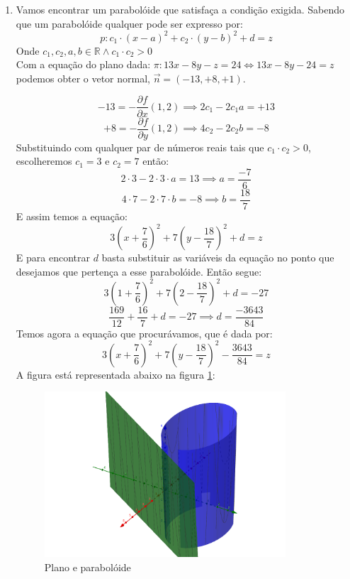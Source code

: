\documentclass[english,ngerman,parskip=half]{scrartcl}
\begin{document}
\begin{enumerate}
    \item
        Vamos encontrar um parabolóide que satisfaça a condição exigida.
        Sabendo que um parabolóide qualquer pode ser expresso por:
        $$ p: c_1 \cdot \left( x - a \right)^2 + c_2 \cdot \left( y - b\right)^2 + d = z$$
        Onde $c_1, c_2, a, b \in \mathbb{R} \land c_1 \cdot c_2 > 0$ \\
        Com a equação do plano dada: $ \pi: 13x - 8y - z = 24 \iff 13x -8y -24 = z$ podemos obter o vetor normal, 
        $\overrightarrow{n} = (-13, +8, +1)$. 

        $$ -13 = -\dfrac{\partial f}{\partial x} (1,2) \implies 2c_1 - 2c_1a = +13$$
        $$ +8 = -\dfrac{\partial f}{\partial y} (1,2) \implies 4c_2 - 2c_2b = -8$$
        Substituindo com qualquer par de números reais tais que $c_1 \cdot c_2 > 0$, escolheremos $c_1 = 3$ e $c_2 = 7$ então:
        $$ 2 \cdot 3 - 2 \cdot 3 \cdot a = 13 \implies a = \dfrac{-7}{6}$$
        $$ 4 \cdot 7 - 2 \cdot 7 \cdot b = -8 \implies b = \dfrac{18}{7}$$
        E assim temos a equação:
        $$ 3 \left( x + \dfrac{7}{6} \right)^2 + 7 \left( y - \dfrac{18}{7} \right)^2 + d = z $$
        E para encontrar $d$ basta substituir as variáveis da equação no ponto que desejamos que pertença a esse parabolóide.
        Então segue:
        $$ 3 \left( 1 + \dfrac{7}{6} \right)^2 + 7 \left( 2 - \dfrac{18}{7} \right)^2 + d = -27 $$
        $$ \dfrac{169}{12} +\dfrac{16}{7} + d = -27 \implies d = \dfrac{-3643}{84}$$
        Temos agora a equação que procurávamos, que é dada por:
        $$ 3 \left( x + \dfrac{7}{6} \right)^2 + 7 \left( y - \dfrac{18}{7} \right)^2 -\dfrac{3643}{84} = z $$
        A figura está representada abaixo na figura \ref{exercicio1}:
        \begin{figure}[ht!]
            \centering
            \includegraphics[width=90mm]{./images/exercicio1.png}
            \caption{Plano e parabolóide\label{exercicio1}}
        \end{figure}
\newpage


\end{enumerate}
\end{document}
